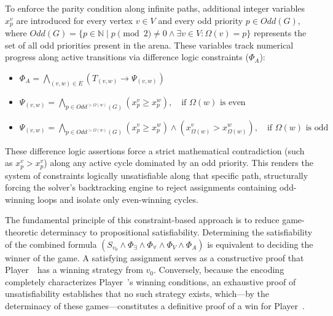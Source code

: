 \documentclass[a4paper,fleqn]{cas-sc}
\begin{document}
To enforce the parity condition along infinite paths, additional integer variables $x_p^v$ are introduced for every vertex $v \in V$ and every odd priority $p \in \textit{Odd}(G)$, where $\textit{Odd}(G) = \{ p \in \mathbb{N} \mid p \pmod 2 \neq 0 \land \exists v \in V: \Omega(v) = p \}$ represents the set of all odd priorities present in the arena. These variables track numerical progress along active transitions via difference logic constraints ($\Phi_A$):

\begin{itemize}
    \item $\Phi_A = \bigwedge_{(v,w) \in E} \left(T_{(v,w)} \rightarrow \Psi_{(v,w)}\right)$
    \item $\Psi_{(v,w)} = \bigwedge_{p \in \textit{Odd}^{>\Omega(w)}(G)} (x_p^v \geqslant x_p^w), \quad \text{if } \Omega(w) \text{ is even}$
    \item $\Psi_{(v,w)} = \bigwedge_{p \in \textit{Odd}^{>\Omega(w)}(G)} (x_p^v \geqslant x_p^w) \land (x_{\Omega(w)}^v > x_{\Omega(w)}^w), \quad \text{if } \Omega(w) \text{ is odd}$
\end{itemize}
These difference logic assertions force a strict mathematical contradiction (such as $x_p^v > x_p^v$) along any active cycle dominated by an odd priority. This renders the system of constraints logically unsatisfiable along that specific path, structurally forcing the solver's backtracking engine to reject assignments containing odd-winning loops and isolate only even-winning cycles.

The fundamental principle of this constraint-based approach is to reduce game-theoretic determinacy to propositional satisfiability. Determining the satisfiability of the combined formula $(S_{v_0} \wedge \Phi_{\exists} \wedge \Phi_{\forall} \wedge \Phi_V \wedge \Phi_A)$ is equivalent to deciding the winner of the game. A satisfying assignment serves as a constructive proof that Player~\even\ has a winning strategy from $v_0$. Conversely, because the encoding completely characterizes Player~\even's winning conditions, an exhaustive proof of unsatisfiability establishes that no such strategy exists, which—by the determinacy of these games—constitutes a definitive proof of a win for Player~\odd.
\end{document}
